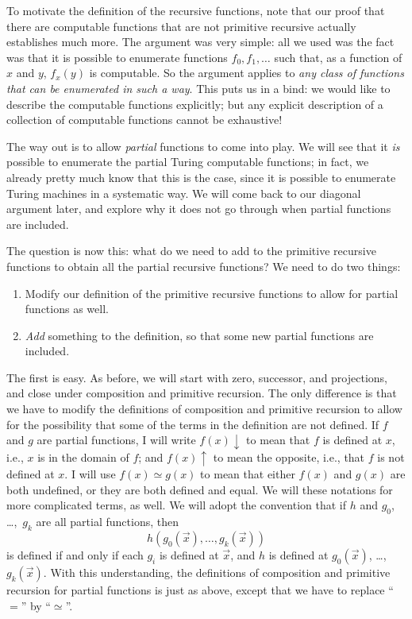 \documentclass[../../include/open-logic-section]{subfiles}
\begin{document}


To motivate the definition of the recursive functions, note that our
proof that there are computable functions that are not primitive
recursive actually establishes much more. The argument was very
simple: all we used was the fact was that it is possible to enumerate
functions $f_0,f_1,\dots$ such that, as a function of $x$ and $y$,
$f_x(y)$ is computable. So the argument applies to \emph{any class of
  functions that can be enumerated in such a way}. This puts us in a
bind: we would like to describe the computable functions explicitly;
but any explicit description of a collection of computable functions
cannot be exhaustive!

The way out is to allow \emph{partial} functions to come into play. We
will see that it \emph{is} possible to enumerate the partial Turing
computable functions; in fact, we already pretty much know that this
is the case, since it is possible to enumerate Turing machines in a
systematic way. We will come back to our diagonal argument later, and
explore why it does not go through when partial functions are
included.

The question is now this: what do we need to add to the primitive
recursive functions to obtain all the partial recursive functions? We
need to do two things:
\begin{enumerate}
\item Modify our definition of the primitive recursive functions to
  allow for partial functions as well.
\item \emph{Add} something to the definition, so that some new partial
  functions are included.
\end{enumerate}

The first is easy. As before, we will start with zero, successor, and
projections, and close under composition and primitive recursion. The
only difference is that we have to modify the definitions of
composition and primitive recursion to allow for the possibility that
some of the terms in the definition are not defined. If $f$ and $g$
are partial functions, I will write $f(x) \downarrow$ to mean that $f$
is defined at $x$, i.e., $x$ is in the domain of $f$; and $f(x)
\uparrow$ to mean the opposite, i.e., that $f$ is not defined at $x$.
I will use $f(x) \simeq g(x)$ to mean that either $f(x)$ and $g(x)$
are both undefined, or they are both defined and equal. We will these
notations for more complicated terms, as well. We will adopt the
convention that if $h$ and $g_0$, \dots,~$g_k$ are all partial functions,
then
\[
h(g_0(\vec x),\dots,g_k(\vec x))
\]
is defined if and only if each $g_i$ is defined at $\vec x$, and $h$
is defined at $g_0(\vec x)$, \dots,~$g_k(\vec x)$. With this
understanding, the definitions of composition and primitive recursion
for partial functions is just as above, except that we have to replace
``$=$'' by ``$\simeq$''.
\end{document}
